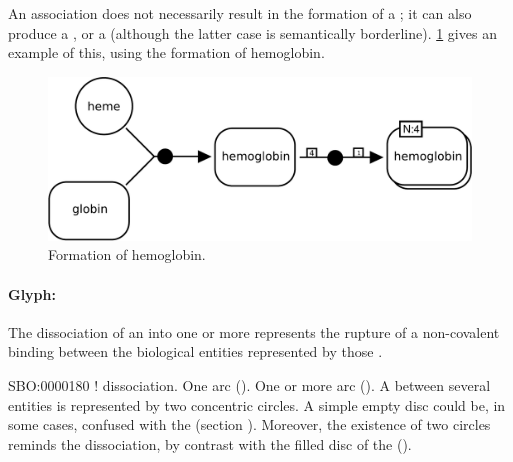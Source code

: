 An association does not necessarily result in the formation of a ; it can also produce a , or a  (although the latter case is semantically borderline).  \ref{fig:assoc-multi} gives an example of this, using the formation of hemoglobin.

\begin{figure}[H]
  \centering
  \includegraphics[scale = 0.3]{examples/association-multimerisation}
  \caption{Formation of hemoglobin.}
  \label{fig:assoc-multi}
\end{figure}





\paragraph{Glyph: }\label{sec:dissociation}

The dissociation of an  into one or more  represents the rupture of a non-covalent binding between the biological entities represented by those .

\begin{glyphDescription}
 \glyphSboTerm SBO:0000180 ! dissociation.
 \glyphOrigin One  arc ().
 \glyphTarget  One or more  arc ().
 \glyphNode A  between several entities is represented by two concentric circles. A simple empty disc could be, in some cases, confused with the  (section ). Moreover, the existence of two circles reminds the dissociation, by contrast with the filled disc of the  ().
 \end{glyphDescription}


